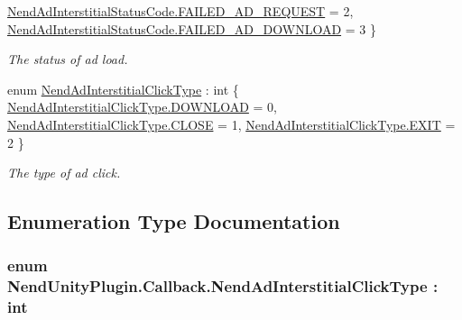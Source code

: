 \begin{DoxyCompactItemize}
\hyperlink{namespace_nend_unity_plugin_1_1_callback_a439eb407799e3077fd18b7f3809f68d6a97dcd033dc8770f9cc8762aede775308}{Nend\+Ad\+Interstitial\+Status\+Code.\+F\+A\+I\+L\+E\+D\+\_\+\+A\+D\+\_\+\+R\+E\+Q\+U\+E\+S\+T} = 2, 
\hyperlink{namespace_nend_unity_plugin_1_1_callback_a439eb407799e3077fd18b7f3809f68d6ad2916b89cc7b34cd48b603e339016ec9}{Nend\+Ad\+Interstitial\+Status\+Code.\+F\+A\+I\+L\+E\+D\+\_\+\+A\+D\+\_\+\+D\+O\+W\+N\+L\+O\+A\+D} = 3
 \}
\begin{DoxyCompactList}\small\item\em The status of ad load. \end{DoxyCompactList}\item 
enum \hyperlink{namespace_nend_unity_plugin_1_1_callback_a66432900696cae54e04798d6f3a3892d}{Nend\+Ad\+Interstitial\+Click\+Type} \+: int \{ \hyperlink{namespace_nend_unity_plugin_1_1_callback_a66432900696cae54e04798d6f3a3892da631152daefc8201c641fa7a37c397dce}{Nend\+Ad\+Interstitial\+Click\+Type.\+D\+O\+W\+N\+L\+O\+A\+D} = 0, 
\hyperlink{namespace_nend_unity_plugin_1_1_callback_a66432900696cae54e04798d6f3a3892da7286293c9125ac7d7bace94c190bc16d}{Nend\+Ad\+Interstitial\+Click\+Type.\+C\+L\+O\+S\+E} = 1, 
\hyperlink{namespace_nend_unity_plugin_1_1_callback_a66432900696cae54e04798d6f3a3892daa42b2fb0e720a080e79a92f4ca97d927}{Nend\+Ad\+Interstitial\+Click\+Type.\+E\+X\+I\+T} = 2
 \}
\begin{DoxyCompactList}\small\item\em The type of ad click. \end{DoxyCompactList}\end{DoxyCompactItemize}


\subsection{Enumeration Type Documentation}
\hypertarget{namespace_nend_unity_plugin_1_1_callback_a66432900696cae54e04798d6f3a3892d}{}
\subsubsection[{Nend\+Ad\+Interstitial\+Click\+Type}]{\setlength{\rightskip}{0pt plus 5cm}enum {\bf Nend\+Unity\+Plugin.\+Callback.\+Nend\+Ad\+Interstitial\+Click\+Type} \+: int}\label{namespace_nend_unity_plugin_1_1_callback_a66432900696cae54e04798d6f3a3892d}


